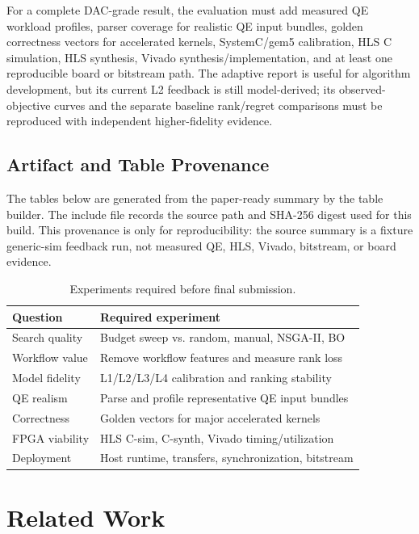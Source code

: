 \documentclass[sigconf,anonymous,review]{acmart}
\begin{document}
For a complete DAC-grade result, the evaluation must add measured QE workload profiles, parser coverage for realistic QE input bundles, golden correctness vectors for accelerated kernels, SystemC/gem5 calibration, HLS C simulation, HLS synthesis, Vivado synthesis/implementation, and at least one reproducible board or bitstream path.  The adaptive report is useful for algorithm development, but its current L2 feedback is still model-derived; its observed-objective curves and the separate baseline rank/regret comparisons must be reproduced with independent higher-fidelity evidence.

\subsection{Artifact and Table Provenance}

The tables below are generated from the paper-ready summary by the table builder.  The include file records the source path and SHA-256 digest used for this build.  This provenance is only for reproducibility: the source summary is a fixture generic-sim feedback run, not measured QE, HLS, Vivado, bitstream, or board evidence.



\begin{table}
  \caption{Experiments required before final submission.}
  \label{tab:missing}
  \small
  \begin{tabular}{@{}ll@{}}
    \toprule
    Question & Required experiment \\
    \midrule
    Search quality & Budget sweep vs. random, manual, NSGA-II, BO \\
    Workflow value & Remove workflow features and measure rank loss \\
    Model fidelity & L1/L2/L3/L4 calibration and ranking stability \\
    QE realism & Parse and profile representative QE input bundles \\
    Correctness & Golden vectors for major accelerated kernels \\
    FPGA viability & HLS C-sim, C-synth, Vivado timing/utilization \\
    Deployment & Host runtime, transfers, synchronization, bitstream \\
    \bottomrule
  \end{tabular}
\end{table}

\section{Related Work}
\end{document}

